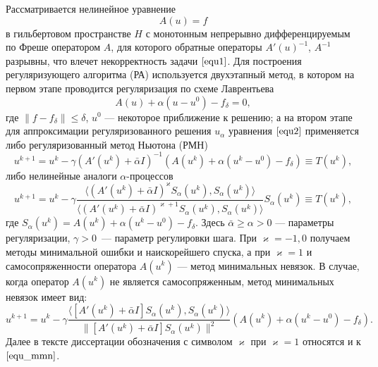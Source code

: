 Рассматривается нелинейное уравнение
\begin{equation}\label{equ1}A(u)=f\end{equation}
в гильбертовом пространстве $H$ с монотонным непрерывно дифференцируемым по Фреше оператором $A$, для которого обратные операторы $A'(u)^{-1}$, $A^{-1}$ разрывны, что влечет некорректность задачи $\eqref{equ1}$. Для построения регуляризующего алгоритма (РА) используется двухэтапный метод, в котором на первом этапе проводится регуляризация по схеме Лаврентьева
\begin{equation}\label{equ2}A(u)+\alpha(u-u^0)-f_\delta=0,\end{equation}
где $\|f-f_\delta\|\le\delta$, $u^0$ --- некоторое приближение к решению; а на втором этапе для аппроксимации регуляризованного решения $u_\alpha$ уравнения $\eqref{equ2}$ применяется либо регуляризованный метод Ньютона (РМН)
\begin{equation}\label{equ_rmn}
u^{k+1}=u^k-\gamma(A'(u^k)+\bar\alpha I)^{-1}(A(u^k)+\alpha(u^k-u^0)-f_\delta)\equiv{T(u^k)},
\end{equation}
либо нелинейные аналоги $\alpha$-процессов
\begin{equation}\label{equ_alphaproc}
u^{k+1}=u^k-\gamma\frac{\langle (A'(u^k)+\bar\alpha I)^{\varkappa}S_\alpha(u^k), S_\alpha(u^k)\rangle }{\langle(A'(u^k)+\bar\alpha I)^{\varkappa+1}S_\alpha(u^k), S_\alpha(u^k)\rangle }S_\alpha(u^k)\equiv{T(u^k)},
\end{equation}
где $S_\alpha(u^k)=A(u^k)+\alpha(u^k-u^0)-f_\delta$. Здесь $\bar\alpha \ge \alpha >0$ --- параметры регуляризации, $\gamma>0$~--- параметр регулировки шага. При $\varkappa=-1,0$ получаем методы минимальной ошибки и наискорейшего спуска, а при $\varkappa=1$ и самосопряженности оператора $A(u^k)$ --- метод минимальных невязок.    
В случае, когда оператор $A(u^k)$ не является самосопряженным, метод минимальных невязок имеет вид:
\begin{equation}\label{equ_mmn}
u^{k+1} =u^k - \gamma\frac{\langle [A'(u^k)+\bar{\alpha}I]S_\alpha(u^k), S_\alpha (u^k)\rangle}{\|[A'(u^k)+\bar{\alpha}I]S_\alpha(u^k)\|^2}(A(u^k)+\alpha(u^k-u^0)-f_\delta).
\end{equation}
Далее в тексте диссертации обозначения с символом $\varkappa$ при $\varkappa=1$ относятся и к $\eqref{equ_mmn}$.

